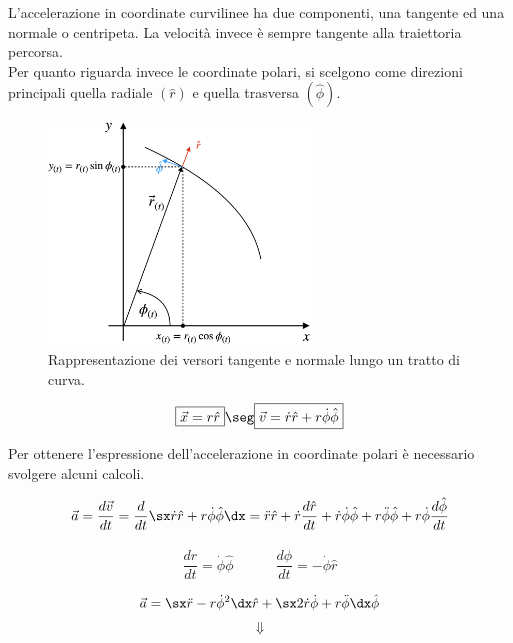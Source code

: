                                                                                    
L'accelerazione in coordinate curvilinee ha due componenti, una tangente ed una normale o centripeta. La velocità invece è sempre tangente alla traiettoria percorsa.\\
Per quanto riguarda invece le coordinate polari, si scelgono come direzioni principali quella radiale $(\hat r)$ e quella trasversa $(\hat\phi)$.

\begin{figure}[htbp]
\centering
\includegraphics[width=7cm]{images/coordpol.png}
\caption{Rappresentazione dei versori tangente e normale lungo un tratto di curva.}
\label{etichetta1}
\end{figure}


\begin{equation}
\boxed{\vec x = r\hat r} \seg \boxed{\vec v = \dot r \hat r + r\dot\phi\hat\phi}
\end{equation}

Per ottenere l'espressione dell'accelerazione in coordinate polari è necessario svolgere alcuni calcoli.

\begin{equation}
\vec a = \frac{d\vec v}{dt} = \frac{d}{dt}\sx \dot r \hat r + r\dot\phi\hat\phi \dx = \ddot r\hat r + \dot r\frac{d\hat r}{dt} + \dot r \dot \phi \hat\phi + r\ddot\phi\hat\phi + r\dot\phi\frac{d\hat \phi}{dt}
\end{equation}

\begin{equation}
\frac{d\hat r}{dt} = \dot\phi\hat\phi\quad\quad\quad \frac{d\hat \phi}{dt} = -\dot\phi\hat r
\end{equation}

\begin{equation}
\vec a = \sx \ddot r - r\dot\phi^2\dx\hat r + \sx 2\dot r\dot\phi + r\ddot\phi\dx\hat\phi
\end{equation}
$$\Downarrow$$

